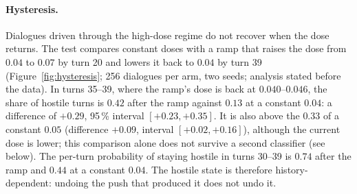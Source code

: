 \paragraph{Hysteresis.} Dialogues driven through the high-dose regime do not recover when the dose returns. The
test compares constant doses with a ramp that raises the dose from $0.04$ to $0.07$ by turn 20 and lowers it back to
$0.04$ by turn 39 (Figure~\ref{fig:hysteresis}; 256 dialogues per arm, two seeds; analysis stated before the data).
In turns 35--39, where the ramp's dose is back at $0.040$--$0.046$, the share of hostile turns is $0.42$ after the ramp
against $0.13$ at a constant $0.04$: a difference of $+0.29$, 95\,\% interval $[+0.23,+0.35]$. It is also above the
$0.33$ of a constant $0.05$ (difference $+0.09$, interval $[+0.02,+0.16]$), although the current dose is lower; this
comparison alone does not survive a second classifier (see below). The per-turn probability of staying hostile in
turns 30--39 is $0.74$ after the ramp and $0.44$ at a constant $0.04$. The hostile state is therefore
history-dependent: undoing the push that produced it does not undo it.

